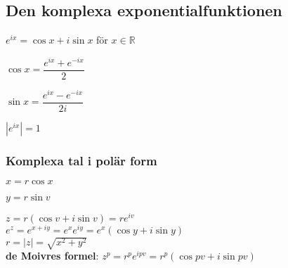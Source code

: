 \documentclass{article}
\begin{document}
\subsection{Den komplexa exponentialfunktionen}
\begin{doublespace}
$e^{ix} = \cos x + i \sin x$ för $x \in \mathbb{R}$\\
\begin{minipage}[t]{0.5\textwidth}
$\cos x = \dfrac{e^{ix} + e^{-ix}}{2}$\\
\end{minipage}
\begin{minipage}[t]{0.5\textwidth}
$\sin x = \dfrac{e^{ix} - e^{-ix}}{2i}$\\
\end{minipage}
$|e^{ix}| = 1$
\subsubsection{Komplexa tal i polär form}
\begin{minipage}[t]{0.5\textwidth}
$x = r \cos x$
\end{minipage}
\begin{minipage}[t]{0.5\textwidth}
$y = r \sin v$
\end{minipage}
$z = r(\cos v + i \sin v) = re^{iv}$\\
$e^z = e^{x + iy} = e^xe^{iy} = e^x(\cos y + i\sin y)$\\
$r = |z| = \sqrt{x^2 + y^2}$\\
\textbf{de Moivres formel}: $z^p = r^pe^{ipv} = r^p(\cos pv + i\sin pv)$
\end{doublespace}
\end{document}
